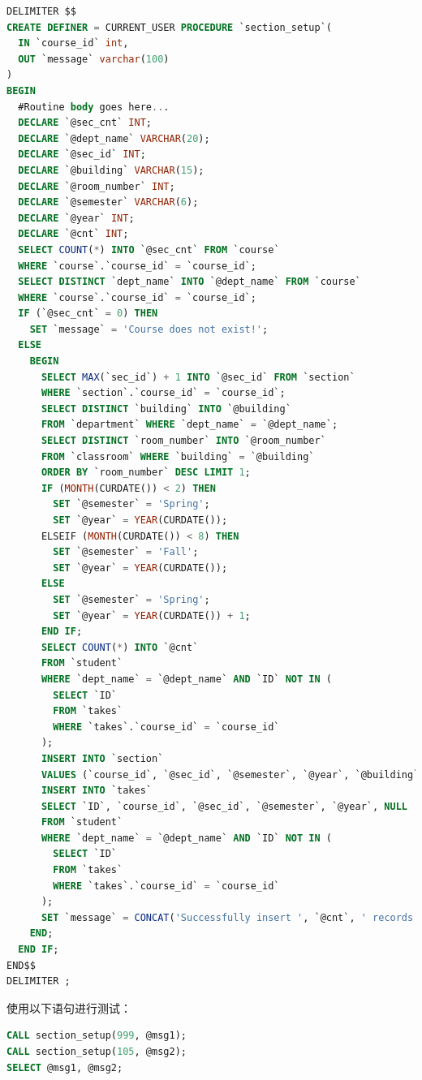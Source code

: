 \documentclass{article}
\begin{document}
\begin{enumerate}
        \begin{lstlisting}[language=sql]
DELIMITER $$
CREATE DEFINER = CURRENT_USER PROCEDURE `section_setup`(
  IN `course_id` int,
  OUT `message` varchar(100)
)
BEGIN
  #Routine body goes here...
  DECLARE `@sec_cnt` INT;
  DECLARE `@dept_name` VARCHAR(20);
  DECLARE `@sec_id` INT;
  DECLARE `@building` VARCHAR(15);
  DECLARE `@room_number` INT;
  DECLARE `@semester` VARCHAR(6);
  DECLARE `@year` INT;
  DECLARE `@cnt` INT;
  SELECT COUNT(*) INTO `@sec_cnt` FROM `course`
  WHERE `course`.`course_id` = `course_id`;
  SELECT DISTINCT `dept_name` INTO `@dept_name` FROM `course`
  WHERE `course`.`course_id` = `course_id`;
  IF (`@sec_cnt` = 0) THEN
    SET `message` = 'Course does not exist!';
  ELSE
    BEGIN
      SELECT MAX(`sec_id`) + 1 INTO `@sec_id` FROM `section`
      WHERE `section`.`course_id` = `course_id`;
      SELECT DISTINCT `building` INTO `@building` 
      FROM `department` WHERE `dept_name` = `@dept_name`;
      SELECT DISTINCT `room_number` INTO `@room_number`
      FROM `classroom` WHERE `building` = `@building`
      ORDER BY `room_number` DESC LIMIT 1;
      IF (MONTH(CURDATE()) < 2) THEN
        SET `@semester` = 'Spring';
        SET `@year` = YEAR(CURDATE());
      ELSEIF (MONTH(CURDATE()) < 8) THEN
        SET `@semester` = 'Fall';
        SET `@year` = YEAR(CURDATE());
      ELSE
        SET `@semester` = 'Spring';
        SET `@year` = YEAR(CURDATE()) + 1;
      END IF;
      SELECT COUNT(*) INTO `@cnt`
      FROM `student`
      WHERE `dept_name` = `@dept_name` AND `ID` NOT IN (
        SELECT `ID`
        FROM `takes`
        WHERE `takes`.`course_id` = `course_id`
      );
      INSERT INTO `section`
      VALUES (`course_id`, `@sec_id`, `@semester`, `@year`, `@building`, `@room_number`, 'A');
      INSERT INTO `takes`
      SELECT `ID`, `course_id`, `@sec_id`, `@semester`, `@year`, NULL
      FROM `student`
      WHERE `dept_name` = `@dept_name` AND `ID` NOT IN (
        SELECT `ID`
        FROM `takes`
        WHERE `takes`.`course_id` = `course_id`
      );
      SET `message` = CONCAT('Successfully insert ', `@cnt`, ' records.');
    END;
  END IF;
END$$
DELIMITER ;
\end{lstlisting}

        使用以下语句进行测试：

        \begin{lstlisting}[language=sql]
CALL section_setup(999, @msg1);
CALL section_setup(105, @msg2);
SELECT @msg1, @msg2;
\end{lstlisting}


\end{enumerate}
\end{document}
